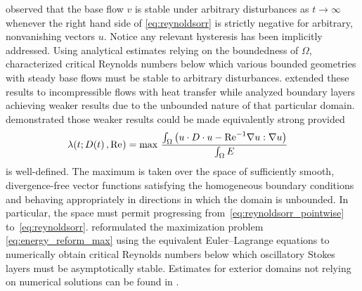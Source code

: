 \citet{Serrin1959Stability} observed that the base flow $v$ is stable under
arbitrary disturbances as $t\to\infty$ whenever the right hand side of
\eqref{eq:reynoldsorr} is strictly negative for arbitrary, nonvanishing
vectors $u$.  Notice any relevant hysteresis has been implicitly addressed.
Using analytical estimates relying on the boundedness of $\Omega$,
\citeauthor{Serrin1959Stability} characterized critical Reynolds numbers below
which various bounded geometries with steady base flows must be stable to
arbitrary disturbances.  \citet{Joseph1965Stability,Joseph1966Nonlinear}
extended these results to incompressible flows with heat transfer while
\citet{Dudis1971Ekman,Dudis1971Buoyancy} analyzed boundary layers achieving
weaker results due to the unbounded nature of that particular domain.
\citet{Davis1973Reformulation} demonstrated those weaker results could be made
equivalently strong provided
\begin{align}
  \lambda\!\left(t ; D\!\left(t\right), \Reynolds\right)
&= \max \, \frac{%
  \int_\Omega \left(
      u \cdot D \cdot u - \Reynolds^{-1} \nabla u : \nabla u
  \right)
}{%
  \int_\Omega E
}
\label{eq:energy_reform_max}
\end{align}
is well-defined.  The maximum is taken over the space of sufficiently smooth,
divergence-free vector functions satisfying the homogeneous boundary conditions
and behaving appropriately in directions in which the domain is unbounded.  In
particular, the space must permit progressing
from~\eqref{eq:reynoldsorr_pointwise} to~\eqref{eq:reynoldsorr}.
%
%
\citeauthor{Davis1973Reformulation} reformulated the maximization problem
\eqref{eq:energy_reform_max} using the equivalent Euler--Lagrange equations to
numerically obtain critical Reynolds numbers below which oscillatory Stokes
layers must be asymptotically stable.  Estimates for exterior domains
not relying on numerical solutions can be found
in \citet{Galdi1983Local,Maremonti1984Asymptotic}.

